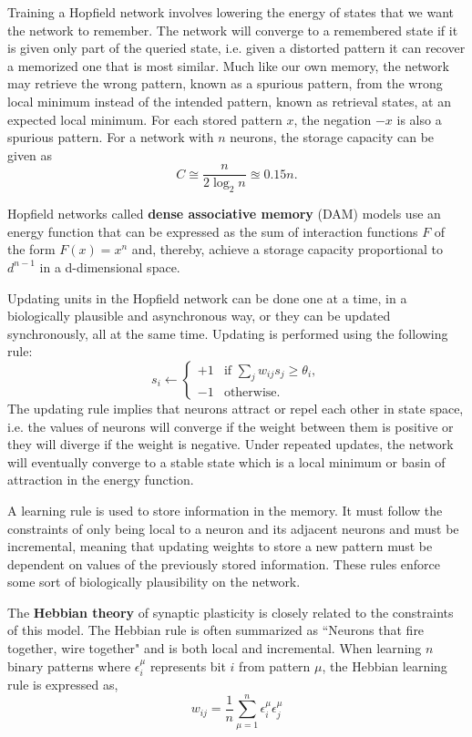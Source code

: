 \documentclass{article}
\begin{document}
Training a Hopfield network involves lowering the energy of states that we want the network to remember. The network will converge to a remembered state if it is given only part of the queried state, i.e. given a distorted pattern it can recover a memorized one that is most similar. Much like our own memory, the network may retrieve the wrong pattern, known as a spurious pattern, from the wrong local minimum instead of the intended pattern, known as retrieval states, at an expected local minimum. For each stored pattern $x$, the negation $-x$ is also a spurious pattern. For a network with $n$ neurons, the storage capacity can be given as 
\[
    C\cong {\frac {n}{2\log _{2}n}} \approxeq 0.15n. 
\]

Hopfield networks called \textbf{dense associative memory} (DAM) models use an energy function that can be expressed as the sum of interaction functions $F$ of the form $F(x) = x^n$ and, thereby, achieve a storage capacity proportional to $d^{n-1}$ in a d-dimensional space.

Updating units in the Hopfield network can be done one at a time, in a biologically plausible and asynchronous way, or they can be updated synchronously, all at the same time. Updating is performed using the following rule:
\[
s_{i} \leftarrow \left\{
    {
    \begin{array}{ll}+1&{\mbox{if }} \displaystyle \sum _{{j}}{w_{{ij}}s_{j}}\geq \theta _{i},\\-1&{\mbox{otherwise.}}\end{array}
    }\right.
\]
The updating rule implies that neurons attract or repel each other in state space, i.e. the values of neurons will converge if the weight between them is positive or they will diverge if the weight is negative. Under repeated updates, the network will eventually converge to a stable state which is a local minimum or basin of attraction in the energy function. 

A learning rule is used to store information in the memory. It must follow the constraints of only being local to a neuron and its adjacent neurons and must be incremental, meaning that updating weights to store a new pattern must be dependent on values of the previously stored information. These rules enforce some sort of biologically plausibility on the network.

The \textbf{Hebbian theory} of synaptic plasticity is closely related to the constraints of this model. The Hebbian rule is often summarized as ``Neurons that fire together, wire together" and is both local and incremental. When learning $n$ binary patterns where $\epsilon_{i}^{\mu }$ represents bit $i$ from pattern $\mu$, the Hebbian learning rule is expressed as,
\[
 w_{{ij}}={\frac  {1}{n}}\sum _{{\mu =1}}^{{n}}\epsilon _{{i}}^{\mu }\epsilon _{{j}}^{\mu }
\]
\end{document}
